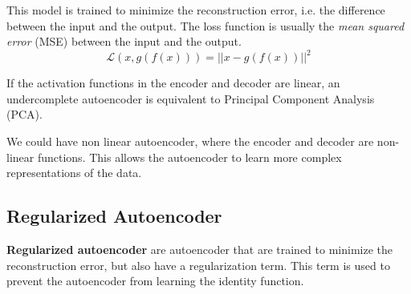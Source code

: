 This model is trained to minimize the reconstruction error, i.e. the difference
between the input and the output. The loss function is usually the \textit{mean
    squared error} (MSE) between the input and the output.
\begin{equation}
    \mathcal{L}(x, g(f(x))) = ||x - g(f(x))||^2
\end{equation}
\begin{note}
    If the activation functions in the encoder and decoder are linear, an 
    undercomplete autoencoder is equivalent to Principal Component Analysis (PCA).
\end{note}

We could have non linear autoencoder, where the encoder and decoder are non-linear
functions. This allows the autoencoder to learn more complex representations of
the data.
\subsection{Regularized Autoencoder}
\textbf{Regularized autoencoder} are autoencoder that are trained to minimize the
reconstruction error, but also have a regularization term. This term is used to
prevent the autoencoder from learning the identity function.

